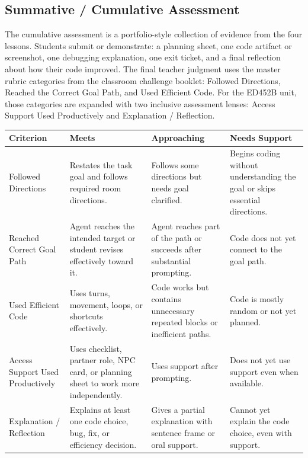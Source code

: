 \documentclass[12pt]{article}
\begin{document}
\subsection{Summative / Cumulative Assessment}
The cumulative assessment is a portfolio-style collection of evidence from the four lessons. Students submit or demonstrate: a planning sheet, one code artifact or screenshot, one debugging explanation, one exit ticket, and a final reflection about how their code improved. The final teacher judgment uses the master rubric categories from the classroom challenge booklet: Followed Directions, Reached the Correct Goal Path, and Used Efficient Code. For the ED452B unit, those categories are expanded with two inclusive assessment lenses: Access Support Used Productively and Explanation / Reflection.

\begin{assessbox}
\begin{tabularx}{\textwidth}{|P{1.35in}|L|L|L|}
\hline
{}\color{white}\bfseries Criterion & \color{white}\bfseries Meets & \color{white}\bfseries Approaching & \color{white}\bfseries Needs Support \\
\hline
Followed Directions & Restates the task goal and follows required room directions. & Follows some directions but needs goal clarified. & Begins coding without understanding the goal or skips essential directions. \\
\hline
Reached Correct Goal Path & Agent reaches the intended target or student revises effectively toward it. & Agent reaches part of the path or succeeds after substantial prompting. & Code does not yet connect to the goal path. \\
\hline
Used Efficient Code & Uses turns, movement, loops, or shortcuts effectively. & Code works but contains unnecessary repeated blocks or inefficient paths. & Code is mostly random or not yet planned. \\
\hline
Access Support Used Productively & Uses checklist, partner role, NPC card, or planning sheet to work more independently. & Uses support after prompting. & Does not yet use support even when available. \\
\hline
Explanation / Reflection & Explains at least one code choice, bug, fix, or efficiency decision. & Gives a partial explanation with sentence frame or oral support. & Cannot yet explain the code choice, even with support. \\
\hline
\end{tabularx}
\end{assessbox}
\end{document}
